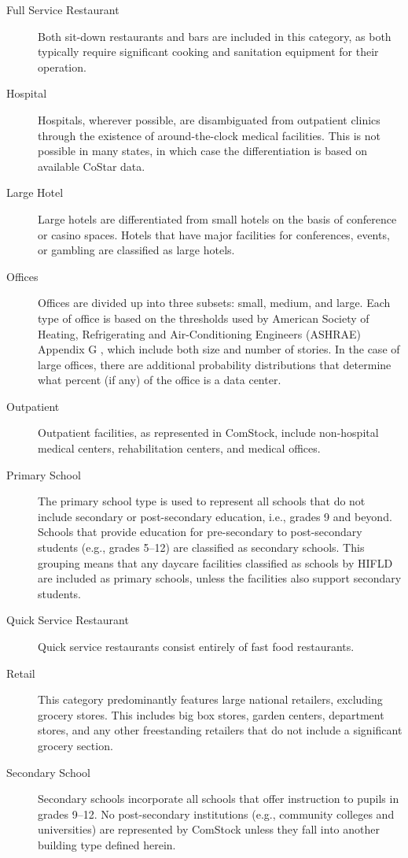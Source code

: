 \begin{description}
\item [Full Service Restaurant] Both sit-down restaurants and bars are included in this category, as both typically require significant cooking and sanitation equipment for their operation.
\item[Hospital] Hospitals, wherever possible, are disambiguated from outpatient clinics through the existence of around-the-clock medical facilities. This is not possible in many states, in which case the differentiation is based on available CoStar data.
\item[Large Hotel] Large hotels are differentiated from small hotels on the basis of conference or casino spaces. Hotels that have major facilities for conferences, events, or gambling are classified as large hotels.
\item[Offices] Offices are divided up into three subsets: small, medium, and large. Each type of office is based on the thresholds used by American Society of Heating, Refrigerating and Air-Conditioning Engineers (ASHRAE) Appendix G \citep{ashrae_901_2010}, which include both size and number of stories. In the case of large offices, there are additional probability distributions that determine what percent (if any) of the office is a data center.
\item[Outpatient] Outpatient facilities, as represented in ComStock, include non-hospital medical centers, rehabilitation centers, and medical offices.
\item[Primary School] The primary school type is used to represent all schools that do not include secondary or post-secondary education, i.e., grades 9 and beyond. Schools that provide education for pre-secondary to post-secondary students (e.g., grades 5--12) are classified as secondary schools. This grouping means that any daycare facilities classified as schools by HIFLD are included as primary schools, unless the facilities also support secondary students.
\item[Quick Service Restaurant] Quick service restaurants consist entirely of fast food restaurants.
\item[Retail] This category predominantly features large national retailers, excluding grocery stores. This includes big box stores, garden centers, department stores, and any other freestanding retailers that do not include a significant grocery section.
\item[Secondary School] Secondary schools incorporate all schools that offer instruction to pupils in grades 9--12. No post-secondary institutions (e.g., community colleges and universities) are represented by ComStock unless they fall into another building type defined herein.

\end{description}
